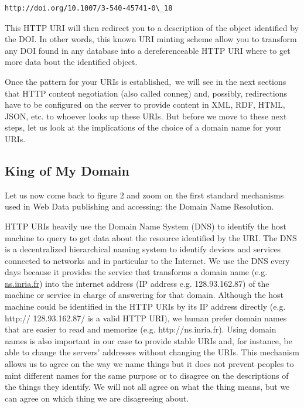 \begin{lstlisting}
http://doi.org/10.1007/3-540-45741-0\_18
\end{lstlisting}


This HTTP URI will then redirect you to a description of the object
identified by the DOI. In other words, this known URI minting scheme
allow you to transform any DOI found in any database into a
dereferenceable HTTP URI where to get more data bout the identified
object.

Once the pattern for your URIs is established,~we will see in the next
sections that HTTP content negotiation (also called conneg) and,
possibly, redirections have to be configured on the server to provide
content in XML, RDF, HTML, JSON, etc. to whoever looks up these URIs.
But before we move to these next steps, let us look at the implications
of the choice of a domain name for your URIs.

\hypertarget{king-of-my-domain}{%
\subsection{King of My Domain}\label{king-of-my-domain}}

Let us now come back to figure 2 and zoom on the first standard
mechanisms used in Web Data publishing and accessing: the Domain Name
Resolution.

HTTP URIs heavily use the Domain Name System (DNS) to identify the host
machine to query to get data about the resource identified by the URI.
The DNS is a decentralized hierarchical naming system to identify
devices and services connected to networks and in particular to the
Internet. We use the DNS every days because it provides the service that
transforms a domain name (e.g. \href{http://www.inria.fr}{ns.inria.fr})
into the internet address (IP address e.g. 128.93.162.87) of the machine
or service in charge of answering for that domain. Although the host
machine could be identified in the HTTP URIs by its IP address directly
(e.g. http:// 128.93.162.87/ is a valid HTTP URI), we human prefer
domain names that are easier to read and memorize (e.g.
http://ns.inria.fr). Using domain names is also important in our case to
provide stable URIs and, for instance, be able to change the servers'
addresses without changing the URIs. This mechanism allows us to agree
on the way we name things but it does not prevent peoples to mint
different names for the same purpose or to disagree on the descriptions
of the things they identify. We will not all agree on what the thing
means, but we can agree on which thing we are disagreeing about.

